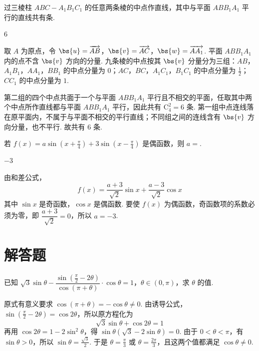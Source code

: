 \begin{problem}
过三棱柱 \(ABC-A_1B_1C_1\) 的任意两条棱的中点作直线，其中与平面 \(ABB_1A_1\) 平行的直线共有\fillinblank{}\(\text{条}\).
\end{problem}

\begin{answer}
\(6\)
\end{answer}

\begin{solution}
取 \(A\) 为原点，令 \(\bs{u}=\overrightarrow{AB}\)，\(\bs{v}=\overrightarrow{AC}\)，\(\bs{w}=\overrightarrow{AA_1}\). 平面 \(ABB_1A_1\) 内的点不含 \(\bs{v}\) 方向的分量. 九条棱的中点按其 \(\bs{v}\) 分量分为三组：\(AB\)，\(A_1B_1\)，\(AA_1\)，\(BB_1\) 的中点分量为 \(0\)；\(AC\)，\(BC\)，\(A_1C_1\)，\(B_1C_1\) 的中点分量为 \(\frac12\)；\(CC_1\) 的中点分量为 \(1\).

第二组的四个中点共面于一个与平面 \(ABB_1A_1\) 平行且不相交的平面，任取其中两个中点所作直线都与平面 \(ABB_1A_1\) 平行，因此共有 \(\mathrm C_4^2=6\) 条. 第一组中点连线落在原平面内，不属于与平面不相交的平行直线；不同组之间的连线含有 \(\bs{v}\) 方向分量，也不平行. 故共有 \(6\) 条.
\end{solution}

\begin{problem}
若 \(f(x)=a\sin\left(x+\frac{\pi}{4}\right)+3\sin\left(x-\frac{\pi}{4}\right)\) 是偶函数，则 \(a=\)\fillinblank{}.
\end{problem}

\begin{answer}
\(-3\)
\end{answer}

\begin{solution}
由和差公式，
\[
f(x)=\frac{a+3}{\sqrt{2}}\sin x+\frac{a-3}{\sqrt{2}}\cos x
\]
其中 \(\sin x\) 是奇函数，\(\cos x\) 是偶函数. 要使 \(f(x)\) 为偶函数，奇函数项的系数必须为零，即 \(\dfrac{a+3}{\sqrt{2}}=0\)，所以 \(a=-3\).
\end{solution}

\section{解答题}
\begin{problem}
已知 \(\sqrt{3}\sin\theta-\dfrac{\sin\left(\frac{\pi}{2}-2\theta\right)}{\cos\left(\pi+\theta\right)}\cdot\cos\theta=1\)，\(\theta\in(0,\pi)\)，求 \(\theta\) 的值.
\end{problem}

\begin{solution}
原式有意义要求 \(\cos(\pi+\theta)=-\cos\theta\neq0\). 由诱导公式，\(\sin\left(\frac{\pi}{2}-2\theta\right)=\cos2\theta\)，所以原方程化为
\[
\sqrt{3}\sin\theta+\cos2\theta=1
\]
再用 \(\cos2\theta=1-2\sin^2\theta\)，得 \(\sin\theta\left(\sqrt{3}-2\sin\theta\right)=0\). 由于 \(0<\theta<\pi\)，有 \(\sin\theta>0\)，所以 \(\sin\theta=\frac{\sqrt{3}}{2}\). 于是 \(\theta=\frac{\pi}{3}\) 或 \(\theta=\frac{2\pi}{3}\)，且这两个值都满足 \(\cos\theta\neq0\).
\end{solution}

